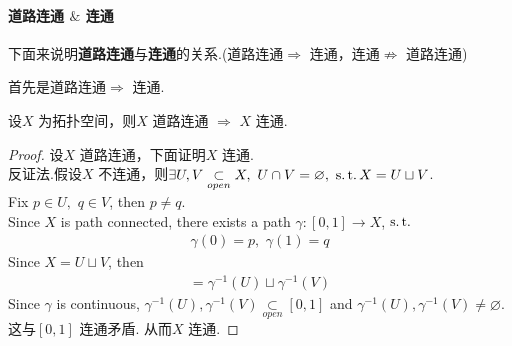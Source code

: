 \newpage
\paragraph{道路连通 $\&$ 连通}
	下面来说明\textbf{道路连通}与\textbf{连通}的关系.(道路连通$\Rightarrow$ 连通，连通$\not\Rightarrow$ 道路连通)
	
	\vspace{2em}
	首先是道路连通$\Rightarrow$ 连通.
	\begin{proposition}\label{prop 2.3.11}
		设$X$ 为拓扑空间，则$X$ 道路连通 $\Rightarrow$ $X$ 连通.
		
		\vspace{2em}
		\begin{proof}
			设$X$ 道路连通，下面证明$X$ 连通.\\
			反证法.假设$X$ 不连通，则$\exists U , V \underset{open}{\subset} X , \,\, U \cap V = \varnothing , \,\, \operatorname{s.t.} X = U \sqcup V$.\\
			Fix $p \in U , \,\, q \in V$, then $p \neq q$.\\
			Since $X$ is path connected, there exists a path $\gamma : [0 , 1] \longrightarrow X$, $\operatorname{s.t.}$
			\begin{align}
				\gamma(0) = p , \,\, \gamma(1) = q
			\end{align}
			Since $X = U \sqcup V$, then
			\begin{align}
				[0 , 1] = \gamma^{-1}(U) \sqcup \gamma^{-1}(V)
			\end{align}
			Since $\gamma$ is continuous, $\gamma^{-1}(U) , \gamma^{-1}(V) \underset{open}{\subset} [0 , 1]$ and $\gamma^{-1}(U) , \gamma^{-1}(V) \neq \varnothing$. \\
			这与$[0 , 1]$ 连通矛盾. 从而$X$ 连通.
		\end{proof}
	\end{proposition}

